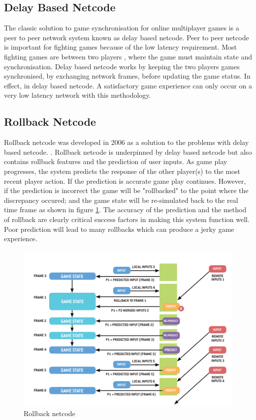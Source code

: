 \documentclass{entcs}
\begin{document}
\subsection{Delay Based Netcode}
The classic solution to game synchronisation for online multiplayer games is a peer to peer network system known as delay based netcode. Peer to peer netcode is important for fighting games because of the low latency requirement. Most fighting games are between two players \cite{FightingGameDefine}, where the game must maintain state and synchronisation. Delay based netcode works by keeping the two players games synchronised, by exchanging network frames, before updating the game status. In effect, in delay based netcode. A satisfactory game experience can only occur on a very low latency network with this methodology.

\subsection{Rollback Netcode}
Rollback netcode was developed in 2006 as a solution to the problems with delay based netcode. \cite{RollbackDevelopment}. Rollback netcode is underpinned by delay based netcode but also contains rollback features and the prediction of user inputs. As game play progresses, the system predicts the response of the other player(s) to the most recent player action. If the prediction is accurate game play continues. However, if the prediction is incorrect the game will be "rollbacked" to the point where the discrepancy occured; and the game state will be re-simulated back to the real time frame as shown in figure \ref{fig:RollbackNetcodeRepresentation}. The accuracy of the prediction and the method of rollback are clearly critical success factors in making this system function well. Poor prediction will lead to many rollbacks which can produce a jerky game experience.

\begin{figure}[H]
\centering
\includegraphics{RollbackNetcodeRepresentation}
\caption{Rollback netcode \cite{GGPODocumentation}}
\label{fig:RollbackNetcodeRepresentation}
\end{figure}
\newpage
\end{document}
